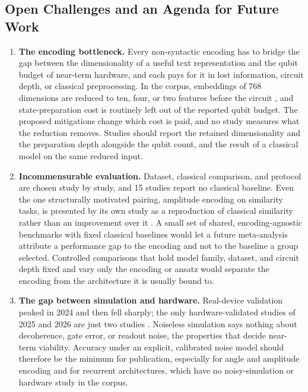 \documentclass{ieeeaccess}
\begin{document}
\subsection{Open Challenges and an Agenda for Future Work}
\label{subsec:open_challenges}
\label{subsec:future_agenda}

\begin{enumerate}
\item[C1)] \textbf{The encoding bottleneck.} Every non-syntactic encoding has to bridge the gap between the dimensionality of a useful text representation and the qubit budget of near-term hardware, and each pays for it in lost information, circuit depth, or classical preprocessing. In the corpus, embeddings of 768 dimensions are reduced to ten, four, or two features before the circuit \cite{ahmad_hybrid_2023,kumar_hybrid_2026,altintas_beyond_2025}, and state-preparation cost is routinely left out of the reported qubit budget. The proposed mitigations \cite{zhang_entangled_2024,tiblias_efficient_2026,silver_lexiql_2024} change which cost is paid, and no study measures what the reduction removes. Studies should report the retained dimensionality and the preparation depth alongside the qubit count, and the result of a classical model on the same reduced input.

\item[C2)] \textbf{Incommensurable evaluation.} Dataset, classical comparison, and protocol are chosen study by study, and 15 studies report no classical baseline. Even the one structurally motivated pairing, amplitude encoding on similarity tasks, is presented by its own study as a reproduction of classical similarity rather than an improvement over it \cite{cavar_word_2025,cavar_old_2026}. A small set of shared, encoding-agnostic benchmarks with fixed classical baselines would let a future meta-analysis attribute a performance gap to the encoding and not to the baseline a group selected. Controlled comparisons that hold model family, dataset, and circuit depth fixed and vary only the encoding or ansatz would separate the encoding from the architecture it is usually bound to.

\item[C3)] \textbf{The gap between simulation and hardware.} Real-device validation peaked in 2024 and then fell sharply; the only hardware-validated studies of 2025 and 2026 are just two studies \cite{baik_neural_2025,liu_experimentally_2026}. Noiseless simulation says nothing about decoherence, gate error, or readout noise, the properties that decide near-term viability. Accuracy under an explicit, calibrated noise model should therefore be the minimum for publication, especially for angle and amplitude encoding and for recurrent architectures, which have no noisy-simulation or hardware study in the corpus.


\end{enumerate}
\end{document}
